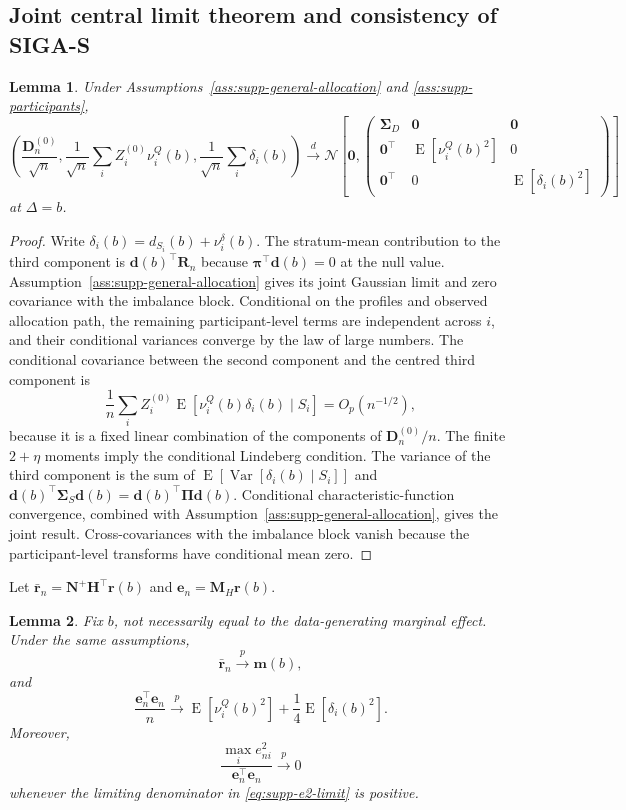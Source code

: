 \documentclass[12pt,a4paper]{article}
\newtheorem{lemma}{Lemma}
\theoremstyle{definition}
\theoremstyle{remark}\newtheorem{remark}{Remark}
\numberwithin{equation}{section}
\newcommand{\E}{\operatorname{E}}
\newcommand{\Var}{\operatorname{Var}}
\begin{document}
\subsection{Joint central limit theorem and consistency of SIGA-S}
\begin{lemma}\label{lem:supp-participant-transform}
Under Assumptions~\ref{ass:supp-general-allocation} and \ref{ass:supp-participants},
\[
\left(
\frac{\bm D_n^{(0)}}{\sqrt n},
\frac1{\sqrt n}\sum_iZ_i^{(0)}\nu_i^Q(b),
\frac1{\sqrt n}\sum_i\delta_i(b)
\right)
\xrightarrow{d}
\mathcal N\left[
\bm0,
\begin{pmatrix}
\bm\Sigma_D&\bm0&\bm0\\
\bm0^\top&\E[\nu_i^Q(b)^2]&0\\
\bm0^\top&0&\E[\delta_i(b)^2]
\end{pmatrix}
\right]
\]
at $\Delta=b$.
\end{lemma}

\begin{proof}
Write $\delta_i(b)=d_{S_i}(b)+\nu_i^\delta(b)$. The stratum-mean contribution to the third component is $\bm d(b)^\top\bm R_n$ because $\bm\pi^\top\bm d(b)=0$ at the null value. Assumption~\ref{ass:supp-general-allocation} gives its joint Gaussian limit and zero covariance with the imbalance block. Conditional on the profiles and observed allocation path, the remaining participant-level terms are independent across $i$, and their conditional variances converge by the law of large numbers. The conditional covariance between the second component and the centred third component is
\[
\frac1n\sum_iZ_i^{(0)}
\E[\nu_i^Q(b)\delta_i(b)\mid S_i]
=O_p(n^{-1/2}),
\]
because it is a fixed linear combination of the components of $\bm D_n^{(0)}/n$. The finite $2+\eta$ moments imply the conditional Lindeberg condition. The variance of the third component is the sum of $\E[\Var[\delta_i(b)\mid S_i]]$ and $\bm d(b)^\top\bm\Sigma_S\bm d(b)=\bm d(b)^\top\bm\Pi\bm d(b)$. Conditional characteristic-function convergence, combined with Assumption~\ref{ass:supp-general-allocation}, gives the joint result. Cross-covariances with the imbalance block vanish because the participant-level transforms have conditional mean zero.
\end{proof}

Let $\bar{\bm r}_n=\bm N^+\bm H^\top\bm r(b)$ and $\bm e_n=\bm M_H\bm r(b)$.

\begin{lemma}\label{lem:supp-score-moments}
Fix $b$, not necessarily equal to the data-generating marginal effect. Under the same assumptions,
\[
\bar{\bm r}_n\xrightarrow{p}\bm m(b),
\]
and
\begin{equation}\label{eq:supp-e2-limit}
\frac{\bm e_n^\top\bm e_n}{n}
\xrightarrow{p}
\E[\nu_i^Q(b)^2]
+\frac14\E[\delta_i(b)^2].
\end{equation}
Moreover,
\[
\frac{\max_i e_{ni}^2}{\bm e_n^\top\bm e_n}
\xrightarrow{p}0
\]
whenever the limiting denominator in \eqref{eq:supp-e2-limit} is positive.
\end{lemma}
\end{document}
